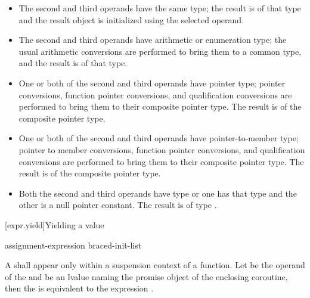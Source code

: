 \begin{itemize}
\item The second and third operands have the same type; the result is of
that type and the result object is initialized using the selected operand.

\item The second and third operands have arithmetic or enumeration type;
the usual arithmetic conversions are performed to bring them to a common
type, and the result is of that type.

\item One or both of the second and third operands have pointer type;
pointer conversions,
function pointer conversions, and
qualification conversions
are performed to bring them to their
composite pointer type. The result is of the composite
pointer type.

\item One or both of the second and third operands have pointer-to-member type;
pointer to member conversions,
function pointer conversions, and
qualification conversions
are performed to bring them to their composite
pointer type. The result is of the composite pointer type.

\item
Both the second and third operands have type  or one has
that type and the other is a null pointer constant. The result is of type
.

\end{itemize}

[expr.yield]{Yielding a value}%
%
%

\begin{bnf}
  \br
   assignment-expression\br
   braced-init-list
\end{bnf}

\pnum
A  shall appear only within a suspension context
of a function.
Let  be the operand of the  and
 be an lvalue naming the promise object of the enclosing
coroutine, then the 
is equivalent to the expression
.

